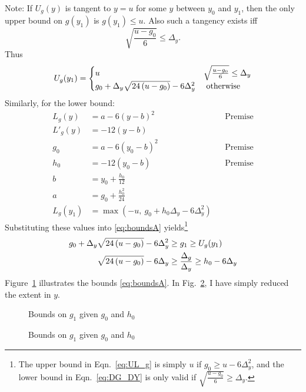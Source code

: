 \documentclass[twocolumn]{article}
\begin{document}
Note: If $U_g(y)$ is tangent to $y=u$ for some $y$ between $y_0$ and
$y_1$, then the only upper bound on $g(y_1)$ is $g(y_1)\leq u$.  Also
such a tangency exists iff
\begin{equation*}
  \sqrt{\frac{u-g_0}{6}} \leq \Delta_y.
\end{equation*}
Thus
\begin{equation}
  \label{eq:ug}
  U_g(y_1) =
  \begin{cases}
    u & \sqrt{\frac{u-g_0}{6}} \leq \Delta_y\\
    g_0 + \Delta_y\sqrt{24\left(u-g_0\right)} - 6 \Delta_y^2 & \text{ otherwise}
  \end{cases}
\end{equation}
Similarly, for the lower bound:
\newcommand{\LgQ}{g_0 + h_0\Delta_y - 6\Delta_y^2}
\begin{align}
  L_g(y) &= a - 6(y-b)^2 &&\text{Premise} \nonumber \\
  L'_g(y) &= -12(y-b) \nonumber \\
  g_0 &= a - 6(y_0-b)^2 &&\text{Premise} \nonumber \\
  h_0 &= -12(y_0-b) &&\text{Premise} \nonumber \\
  b &= y_0 + \frac{h_0}{12} \nonumber \\
  a &= g_0 + \frac{h^2_0}{24} \\
  \label{eq:lg}
  L_g(y_1) &= \max \left( -u,~\LgQ \right)
\end{align}
Substituting these values into \eqref{eq:boundsA} yields\footnote{The
  upper bound in Eqn.\ \eqref{eq:UL_g} is simply $u$ if $g_0 \geq u -
  6 \Delta_y^2$, and the lower bound in Eqn.\ \eqref{eq:DG_DY} is only
  valid if $\sqrt{\frac{u-g_0}{6}} \geq \Delta_y$.}
\begin{align}
  \label{eq:UL_g}
  g_0 + \Delta_y\sqrt{24\left(u-g_0\right)} - 6 \Delta_y^2 &\geq g_1 \geq U_g(y_1) \\
  \label{eq:DG_DY}
  \sqrt{24\left(u-g_0\right)} - 6\Delta_y &\geq \frac{\Delta_g}{\Delta_y} \geq h_0
  - 6 \Delta_y
\end{align}
Figure~\ref{fig:boundsA} illustrates the bounds
\eqref{eq:boundsA}.  In Fig.~\ref{fig:boundsB}, I have simply reduced
the extent in $y$.

\begin{figure}
  \centering
  \caption{Bounds on $g_1$ given $g_0$ and $h_0$}
  \label{fig:boundsA}
\end{figure}
\begin{figure}
  \centering
  \caption{Bounds on $g_1$ given $g_0$ and $h_0$}
  \label{fig:boundsB}
\end{figure}
\end{document}
